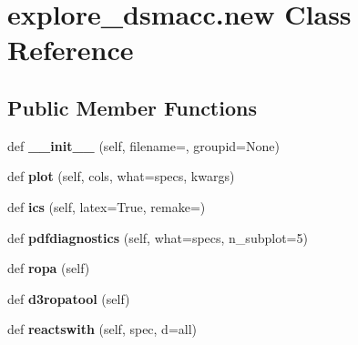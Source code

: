 \hypertarget{classexplore__dsmacc_1_1new}{}\section{explore\+\_\+dsmacc.\+new Class Reference}
\label{classexplore__dsmacc_1_1new}
\subsection*{Public Member Functions}
\begin{DoxyCompactItemize}
\item 
\mbox{\label{classexplore__dsmacc_1_1new_ac9a5be252fe5fa62492d22f6adccfc4a}} 
def {\bfseries \+\_\+\+\_\+init\+\_\+\+\_\+} (self, filename=\textquotesingle{}\textquotesingle{}, groupid=None)
\item 
\mbox{\label{classexplore__dsmacc_1_1new_a7efa1d2712e07026a2189a895c8489c9}} 
def {\bfseries plot} (self, cols, what=\textquotesingle{}specs\textquotesingle{}, kwargs)
\item 
\mbox{\label{classexplore__dsmacc_1_1new_a8bf29ab42b0e3152655ff0bfdd2c1ab2}} 
def {\bfseries ics} (self, latex=True, remake=\textquotesingle{}\textquotesingle{})
\item 
\mbox{\label{classexplore__dsmacc_1_1new_ae48303d87d4152d431dba936080030f7}} 
def {\bfseries pdfdiagnostics} (self, what=\textquotesingle{}specs\textquotesingle{}, n\+\_\+subplot=5)
\item 
\mbox{\label{classexplore__dsmacc_1_1new_aa50b9538f587f469ba1a265bf287929f}} 
def {\bfseries ropa} (self)
\item 
\mbox{\label{classexplore__dsmacc_1_1new_a9d3e99e661c4e1ab0e7ed61403678c91}} 
def {\bfseries d3ropatool} (self)
\item 
\mbox{\label{classexplore__dsmacc_1_1new_ae5c9611c4206460e36cd8a49340bc300}} 
def {\bfseries reactswith} (self, spec, d=\textquotesingle{}all\textquotesingle{})
\item 

\end{DoxyCompactItemize}
